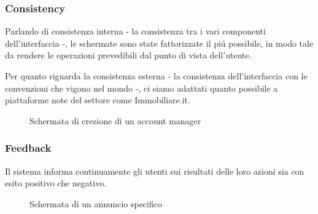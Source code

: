 \subsubsection{Consistency}
Parlando di consistenza interna - la consistenza tra i vari componenti dell'interfaccia -, 
le schermate sono state fattorizzate il piú possibile, in modo tale da
rendere le operazioni prevedibili dal punto di vista dell'utente.

Per quanto riguarda la consistenza esterna - la consistenza dell'interfaccia con
le convenzioni che vigono nel mondo -, ci siamo adattati quanto possibile a piattaforme
note del settore come Immobiliare.it.

\begin{figure}[h]
  \caption{Schermata di crezione di un account manager}
  \label{fig:Schermata di crezione di un account manager}
\end{figure}

\subsubsection{Feedback}
Il sistema informa continuamente gli utenti sui risultati delle loro azioni sia con 
esito positivo che negativo.

\begin{figure}[h]
  \caption{Schermata di un annuncio specifico}
  \label{fig:Schermata di un annuncio specifico}
\end{figure}

